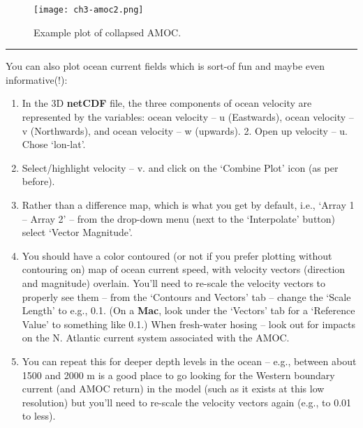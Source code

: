 \documentclass[11pt,fleqn]{book} %
\begin{document}
\begin{figure}
\texttt{[image: ch3-amoc2.png]}\centering
\vspace{-0mm}
\caption{Example plot of collapsed AMOC.}
\label{fig:ch3-amoc2}
\end{figure}

\vspace{1mm}
\noindent\rule{4cm}{0.5pt}
\vspace{2mm}

\noindent You can also plot ocean current fields which is sort-of fun and maybe even informative(!):

\vspace{1mm}
\begin{enumerate}[noitemsep]
\vspace{1mm}
\item  In the 3D \textbf{netCDF} file, the three components of ocean velocity are represented by the variables: ocean velocity – u (Eastwards), ocean velocity – v (Northwards), and ocean velocity – w (upwards). 2. Open up velocity – u. Chose ‘lon-lat’.
\vspace{1mm}
\item Select/highlight velocity – v. and click on the ‘Combine Plot’ icon (as per before).
\vspace{1mm}
\item Rather than a difference map, which is what you get by default, i.e., ‘Array 1 – Array 2’ – from the drop-down menu (next to the ‘Interpolate’ button) select ‘Vector Magnitude’.
\vspace{1mm}
\item You should have a color contoured (or not if you prefer plotting without contouring on) map of ocean current speed, with velocity vectors (direction and magnitude) overlain. You’ll need to re-scale the velocity vectors to properly see them – from the ‘Contours and Vectors’ tab – change the ‘Scale Length’ to e.g., 0.1. (On a \textbf{Mac}, look under the ‘Vectors’ tab for a ‘Reference Value’ to something like 0.1.)  When fresh-water hosing – look out for impacts on the N. Atlantic current system associated with the AMOC.
\vspace{1mm}
\item You can repeat this for deeper depth levels in the ocean – e.g., between about 1500 and 2000 m is a good place to go looking for the Western boundary current (and AMOC return) in the model (such as it exists at this low resolution) but you’ll need to re-scale the velocity vectors again (e.g., to 0.01 to less).
\end{enumerate}
\vspace{1mm}
\end{document}
